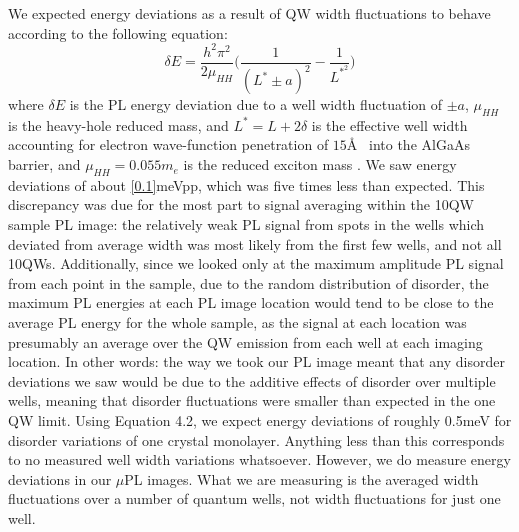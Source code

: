 \newpage
\indent We expected energy deviations as a result of QW width fluctuations to behave according to the following equation:
\begin{equation}
\label{de}
\delta E = \frac{h^2 \pi^2}{2 \mu_{HH}}\Big ( \frac{1}{(L^* \pm a)^2}- \frac{1}{L^{*^2}} \Big )
\end{equation}
where $\delta E$ is the PL energy deviation due to a well width fluctuation of $\pm a$, $\mu_{HH}$ is the heavy-hole reduced mass, and $L^* = L+2\delta$ is the effective well width accounting for electron wave-function penetration of $15$\AA ~ into the AlGaAs barrier, and $\mu_{HH} = 0.055m_e$ is the reduced exciton mass \cite{glinka, santos}. We saw energy deviations of about \ref{0.1}meVpp, which was five times less than expected. This discrepancy was due for the most part to signal averaging within the 10QW sample PL image: the relatively weak PL signal from spots in the wells which deviated from average width was most likely from the first few wells, and not all 10QWs. Additionally, since we looked only at the maximum amplitude PL signal from each point in the sample, due to the random distribution of disorder, the maximum PL energies at each PL image location would tend to be close to the average PL energy for the whole sample, as the signal at each location was presumably an average over the QW emission from each well at each imaging location. In other words: the way we took our PL image meant that any disorder deviations we saw would be due to the additive effects of disorder over multiple wells, meaning that disorder fluctuations were smaller than expected in the one QW limit. Using Equation 4.2, we expect energy deviations of roughly 0.5meV for disorder variations of one crystal monolayer. Anything less than this corresponds to no measured well width variations whatsoever. However, we do measure energy deviations in our $\mu$PL images. What we are measuring is the averaged width fluctuations over a number of quantum wells, not width fluctuations for just one well.



